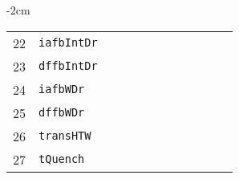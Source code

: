 \begin{table*}[!htbp]
\begin{adjustwidth*}{}{-2cm}
\begin{tabular}{@{}rlrrrrrrrrrc@{}}
\footnotesize{22}  & \footnotesize{\texttt{iafbIntDr}}  &          &          &          &          &     &     & &          &     &     \\
\footnotesize{23}  & \footnotesize{\texttt{dffbIntDr}}  &          &          &          &          &     &     & &          &     &     \\
\footnotesize{24}  & \footnotesize{\texttt{iafbWDr}}    &          &          &          &          &     &     & &          &     &     \\
\footnotesize{25}  & \footnotesize{\texttt{dffbWDr}}    &          &          &          &          &     &     & &          &     &     \\
\footnotesize{26}  & \footnotesize{\texttt{transHTW}}   &          &          &          &          &     &     & &          &     &     \\
\footnotesize{27}  & \footnotesize{\texttt{tQuench}}    &          &          &          &          &     &     & &          &     &     \\
\bottomrule
\end{tabular}
\end{adjustwidth*}
\end{table*}
